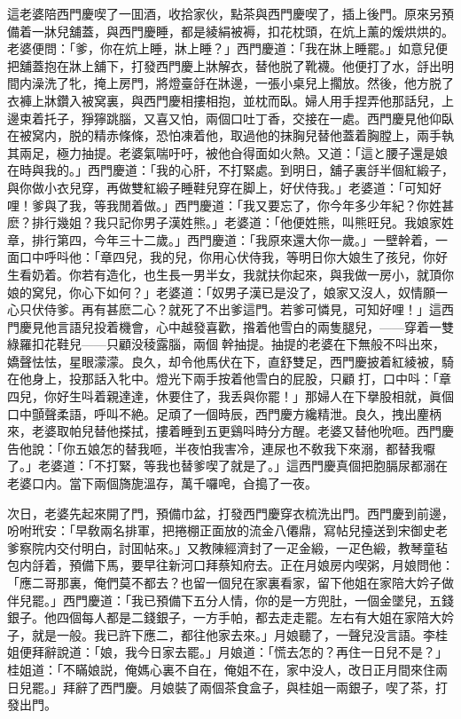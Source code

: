 這老婆陪西門慶喫了一囬酒，收拾家伙，點茶與西門慶喫了，插上後門。原來另預備着一牀兒舖蓋，與西門慶睡，都是綾絹被褥，扣花枕頭，在炕上薰的煖烘烘的。老婆便問：「爹，你在炕上睡，牀上睡？」西門慶道：「我在牀上睡罷。」如意兒便把舖蓋抱在牀上舖下，打發西門慶上牀解衣，替他脱了靴襪。他便打了水，㧱出明間内澡洗了牝，掩上房門，將燈臺㧱在牀邊，一張小桌兒上擱放。然後，他方脱了衣褲上牀鑽入被窝裏，與西門慶相摟相抱，並枕而臥。婦人用手捏弄他那話兒，上邊束着托子，猙獰跳腦，又喜又怕，兩個口吐丁香，交接在一處。西門慶見他仰臥在被窝内，脱的精赤條條，恐怕凍着他，取過他的抹胸兒替他蓋着胸膛上，兩手執其兩足，極力抽提。老婆氣喘吁吁，被他㒲得面如火熱。又道：「這と腰子還是娘在時與我的。」西門慶道：「我的心肝，不打緊處。到明日，舖子裏㧱半個紅緞子，與你做小衣兒穿，再做雙紅緞子睡鞋兒穿在脚上，好伏侍我。」老婆道：「可知好哩！爹與了我，等我閒着做。」西門慶道：「我又要忘了，你今年多少年紀？你姓甚麽？排行幾姐？我只記你男子漢姓熊。」老婆道：「他便姓熊，叫熊旺兒。我娘家姓章，排行第四，今年三十二歲。」西門慶道：「我原來還大你一歲。」一壁幹着，一面口中呼呌他：「章四兒，我的兒，你用心伏侍我，等明日你大娘生了孩兒，你好生看奶着。你若有造化，也生長一男半女，我就扶你起來，與我做一房小，就頂你娘的窝兒，你心下如何？」老婆道：「奴男子漢已是没了，娘家又沒人，奴情願一心只伏侍爹。再有甚麽二心？就死了不出爹這門。若爹可憐見，可知好哩！」這西門慶見他言語兒投着機會，心中越發喜歡，揝着他雪白的兩隻腿兒，——穿着一雙綠羅扣花鞋兒——只顧没稜露腦，兩個𢵞幹抽提。抽提的老婆在下無般不呌出來，嬌聲怯怯，星眼濛濛。良久，却令他馬伏在下，直舒雙足，西門慶披着紅綾被，騎在他身上，投那話入牝中。燈光下兩手按着他雪白的屁股，只顧𢵞打，口中呌：「章四兒，你好生呌着親達達，休要住了，我丢與你罷！」那婦人在下擧股相就，眞個口中顫聲柔語，呼叫不絶。足頑了一個時辰，西門慶方纔精泄。良久，拽出麈柄來，老婆取帕兒替他搽拭，摟着睡到五更鷄呌時分方醒。老婆又替他吮咂。西門慶告他說：「你五娘怎的替我咂，半夜怕我害冷，連尿也不敎我下來溺，都替我嚈了。」老婆道：「不打緊，等我也替爹喫了就是了。」這西門慶真個把胞膈尿都溺在老婆口内。當下兩個旖旎溫存，萬千囉唣，㒲搗了一夜。

次日，老婆先起來開了門，預備巾盆，打發西門慶穿衣梳洗出門。西門慶到前邊，吩咐玳安：「早敎兩名排軍，把捲棚正面放的流金八僊鼎，寫帖兒擡送到宋御史老爹察院内交付明白，討囬帖來。」又教陳經濟封了一疋金緞，一疋色緞，教琴童毡包内㧱着，預備下馬，要早往新河口拜蔡知府去。正在月娘房内喫粥，月娘問他：「應二哥那裏，俺們莫不都去？也留一個兒在家裏看家，留下他姐在家陪大妗子做伴兒罷。」西門慶道：「我已預備下五分人情，你的是一方兜肚，一個金墜兒，五錢銀子。他四個每人都是二錢銀子，一方手帕，都去走走罷。左右有大姐在家陪大妗子，就是一般。我已許下應二，都往他家去來。」月娘聽了，一聲兒没言語。李桂姐便拜辭說道：「娘，我今日家去罷。」月娘道：「慌去怎的？再住一日兒不是？」桂姐道：「不瞞娘説，俺媽心裏不自在，俺姐不在，家中没人，改日正月間來住兩日兒罷。」拜辭了西門慶。月娘裝了兩個茶食盒子，與桂姐一兩銀子，喫了茶，打發出門。

